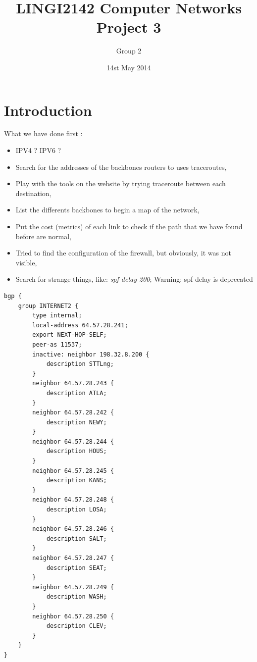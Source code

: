 \documentclass[usenames,dvipsnames]{beamer}
\title[LINGI2142 Project 3]{LINGI2142 Computer Networks \\ Project 3} %
\author[Group 2] {Group 2} %
\institute[INGI] %
{
Université Catholique de Louvain - INGI\\ %
\medskip
}
\date{14st May 2014} %
\begin{document}
\begin{frame}
\titlepage %
\end{frame}


\begin{frame}
	\tableofcontents
\end{frame}

\section*{Introduction}
\begin{frame}{\insertsection}
What we have done first : 
\begin{itemize}
\item IPV4 ? IPV6 ? 
\item Search for the addresses of the backbones routers to uses traceroutes,
\item Play with the tools on the website by trying traceroute between each destination,
\item List the differents backbones to begin a map of the network,
\item Put the cost (metrics) of each link to check if the path that we have found before are normal,
\item Tried to find the configuration of the firewall, but obviously, it was not visible,
\item Search for strange things, like: \textit{spf-delay 200};  Warning: spf-delay is deprecated
\end{itemize}
\end{frame}


\begin{frame}[fragile]{\insertsection}
\begin{lstlisting}
bgp {
	group INTERNET2 {
    	type internal;
    	local-address 64.57.28.241;
		export NEXT-HOP-SELF;
        peer-as 11537;
        inactive: neighbor 198.32.8.200 {
            description STTLng;
        }
        neighbor 64.57.28.243 {
            description ATLA;
        }
        neighbor 64.57.28.242 {
            description NEWY;
        }
        neighbor 64.57.28.244 {
            description HOUS;
        }
        neighbor 64.57.28.245 {
            description KANS;
        }
        neighbor 64.57.28.248 {
            description LOSA;
        }
        neighbor 64.57.28.246 {
            description SALT;
        }
        neighbor 64.57.28.247 {
            description SEAT;
        }
        neighbor 64.57.28.249 {
            description WASH;
        }
        neighbor 64.57.28.250 {
            description CLEV;
        }
	} 
}
\end{lstlisting}
\end{frame}
\end{document}
